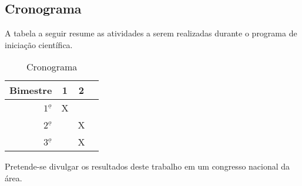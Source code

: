 \documentclass[12pt]{article}
\begin{document}
\subsection{Cronograma}
A tabela a seguir resume as atividades a serem realizadas durante
o programa de iniciação científica.
\begin{table}[!h]
\centering
\caption{Cronograma}
\begin{tabular}{|r|c|c|c|} \hline
Bimestre & 1 & 2 \\
\hline
$1^{\underline{o}}$ & X &  \\
\hline
$2^{\underline{o}}$ &   & X \\
\hline
$3^{\underline{o}}$ &   & X \\
\hline
\end{tabular}
\end{table}

Pretende-se divulgar os resultados deste trabalho em um congresso nacional
da área.



\end{document}
